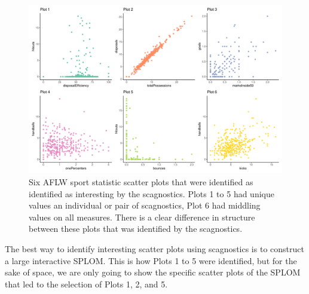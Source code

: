 \begin{Schunk}
\begin{figure}

{\centering \includegraphics[width=0.8\linewidth]{mason-lee-laa-cook_files/figure-latex/AFLW-scatters-static-1} 

}

\caption[Six AFLW sport statistic scatter plots that were identified as identified as interesting by the scagnostics]{Six AFLW sport statistic scatter plots that were identified as identified as interesting by the scagnostics. Plots 1 to 5 had unique values an individual or pair of scagnostics, Plot 6 had middling values on all measures. There is a clear difference in structure between these plots that was identified by the scagnostics.}\label{fig:AFLW-scatters-static}
\end{figure}
\end{Schunk}

The best way to identify interesting scatter plots using scagnostics is
to construct a large interactive SPLOM. This is how Plots 1 to 5 were
identified, but for the sake of space, we are only going to show the
specific scatter plots of the SPLOM that led to the selection of Plots
1, 2, and 5.

